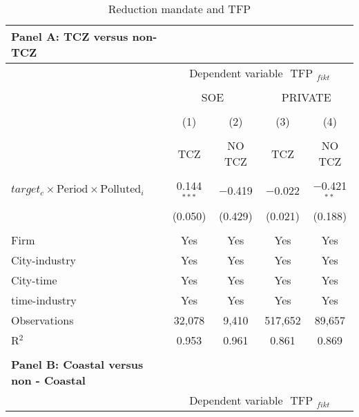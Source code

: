 \documentclass[12pt]{article}
\begin{document}
\begin{table}[!htb] \centering
    \caption{\\ Reduction mandate and TFP}
      \begin{adjustbox}{width=\textwidth, totalheight=\baselineskip,keepaspectratio}
     \label{table_10}
      \begin{tabular}{@{\extracolsep{5pt}}lcccc}  
        \multicolumn{1}{l}{\textbf{Panel A: TCZ versus non-TCZ}} \\
        \toprule
        & \multicolumn{4}{c}{Dependent variable $\text { TFP }_{fikt}$} \\ 
\cline{2-5}
            
\\[-1.8ex]
            &\multicolumn{2}{c}{SOE}&\multicolumn{2}{c}{PRIVATE}\\
\\[-1.8ex] & (1) & (2) & (3) & (4)\\
 \\[-1.8ex]& TCZ & NO TCZ & TCZ & NO TCZ\\
 \hline \\[-1.8ex] 
   $target_c \times \text{Period} \times \text{Polluted}_i$  & 0.144$^{***}$ & $-$0.419 & $-$0.022 & $-$0.421$^{**}$ \\ 
  & (0.050) & (0.429) & (0.021) & (0.188) \\ 
 \hline \\[-1.8ex] 
Firm & Yes & Yes & Yes & Yes \\ 
City-industry &Yes & Yes & Yes & Yes \\ 
City-time & Yes & Yes & Yes & Yes \\ 
time-industry & Yes & Yes & Yes & Yes \\ 
Observations & 32,078 & 9,410 & 517,652 & 89,657 \\ 
R$^{2}$ & 0.953 & 0.961 & 0.861 & 0.869 \\

        \bottomrule
        \\ %
        \multicolumn{1}{l}{\textbf{Panel B: Coastal  versus non - Coastal}} \\
        \toprule
        & \multicolumn{4}{c}{Dependent variable $\text { TFP }_{fikt}$} \\ 
\cline{2-5}
            

\end{tabular}
\end{adjustbox}
\end{table}
\end{document}
